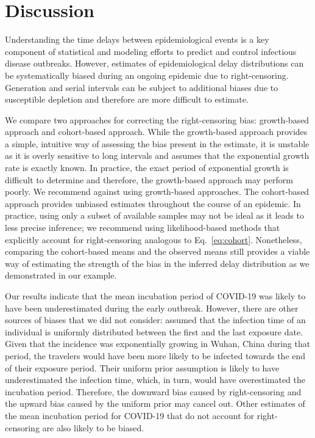\documentclass[12pt]{article}
\newcommand{\eref}[1]{Eq.~\ref{eq:#1}}
\begin{document}

\section{Discussion}

Understanding the time delays between epidemiological events is a key component of statistical and modeling efforts to predict and control infectious disease outbreaks.
However, estimates of epidemiological delay distributions can be systematically biased during an ongoing epidemic due to right-censoring.
Generation and serial intervals can be subject to additional biases due to susceptible depletion and therefore are more difficult to estimate.

We compare two approaches for correcting the right-censoring bias: growth-based approach and cohort-based approach.
While the growth-based approach provides a simple, intuitive way of assessing the bias present in the estimate, it is unstable as it is overly sensitive to long intervals and assumes that the exponential growth rate is exactly known.
In practice, the exact period of exponential growth is difficult to determine \citep{ma2014estimating} and therefore, the growth-based approach may perform poorly.
We recommend against using growth-based approaches.
The cohort-based approach provides unbiased estimates throughout the course of an epidemic.
In practice, using only a subset of available samples may not be ideal as it leads to less precise inference;
we recommend using likelihood-based methods that explicitly account for right-censoring analogous to \eref{cohort}.
Nonetheless, comparing the cohort-based means and the observed means still provides a viable way of estimating the strength of the bias in the inferred delay distribution as we demonstrated in our example.

Our results indicate that the mean incubation period of COVID-19 was likely to have been underestimated during the early outbreak.
However, there are other sources of biases that we did not consider:
\cite{backer2020incubation} assumed that the infection time of an individual is uniformly distributed between the first and the last exposure date.
Given that the incidence was exponentially growing in Wuhan, China during that period, the travelers would have been more likely to be infected towards the end of their exposure period.
Their uniform prior assumption is likely to have underestimated the infection time, which, in turn, would have overestimated the incubation period.
Therefore, the downward bias caused by right-censoring and the upward bias caused by the uniform prior may cancel out.
Other estimates of the mean incubation period for COVID-19 that do not account for right-censoring are also likely to be biased.
\end{document}
